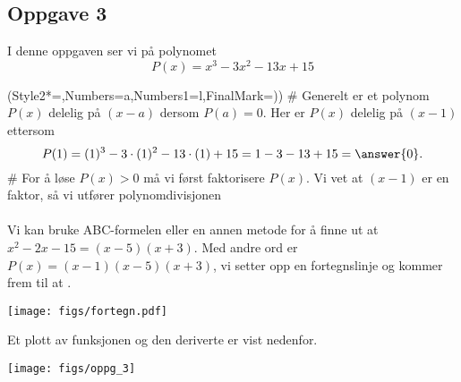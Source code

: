 \subsection*{Oppgave 3}
I denne oppgaven ser vi på polynomet
\begin{equation*}
	P(x) = x^3 - 3x^2 - 13x + 15
\end{equation*}
\begin{easylist}[enumerate]
	\ListProperties(Style2*=,Numbers=a,Numbers1=l,FinalMark={)})
	# Generelt er et polynom $P(x)$ delelig på $(x-a)$ dersom $P(a) = 0$.
	Her er $P(x)$ delelig på $(x-1)$ ettersom 
	\begin{equation*}
	P(1) = (1)^3 - 3\cdot(1)^2 - 13\cdot(1) + 15 = 1 - 3 - 13 + 15 = \answer{0}.
	\end{equation*}
	# For å løse $P(x) > 0$ må vi først faktorisere $P(x)$.
	Vi vet at $(x-1)$ er en faktor, så vi utfører polynomdivisjonen \\
	 \\ 
	Vi kan bruke ABC-formelen eller en annen metode for å finne ut at $x^2 - 2x -15 = (x - 5)(x + 3)$. 
	Med andre ord er $P(x) = (x - 1)(x - 5)(x + 3)$, vi setter opp en fortegnslinje og kommer frem til at .
	
\end{easylist}

\begin{center}
	\texttt{[image: figs/fortegn.pdf]}
\end{center}
Et plott av funksjonen og den deriverte er vist nedenfor.
\begin{center}
	\texttt{[image: figs/oppg\_3]}
\end{center}

